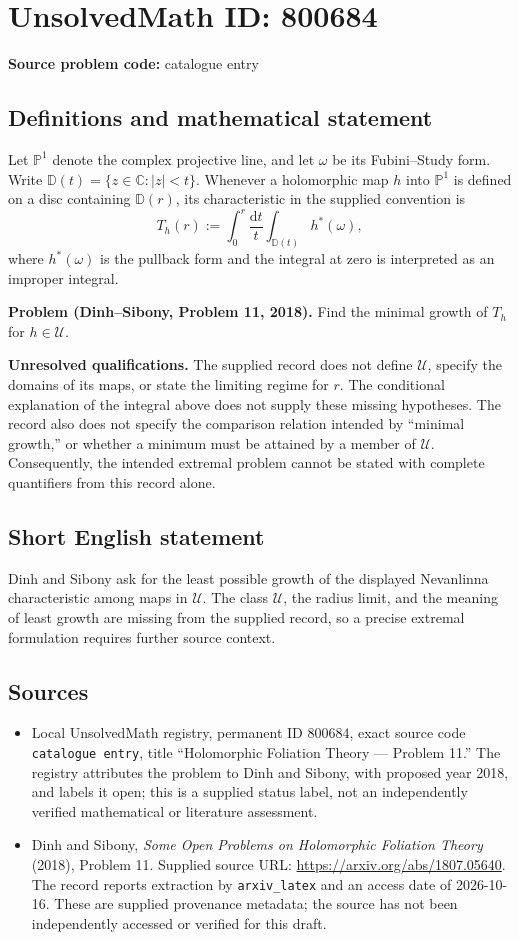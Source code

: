 \documentclass[11pt]{article}
\begin{document}
\section*{UnsolvedMath ID: 800684}
\textbf{Source problem code:} catalogue entry
\subsection{Definitions and mathematical statement}
Let \(\mathbb{P}^{1}\) denote the complex projective line, and let \(\omega\) be its Fubini--Study form. Write \(\mathbb{D}(t)=\{z\in\mathbb{C}:|z|<t\}\). Whenever a holomorphic map \(h\) into \(\mathbb{P}^{1}\) is defined on a disc containing \(\mathbb{D}(r)\), its characteristic in the supplied convention is
\[
T_h(r):=\int_0^r \frac{\mathrm{d}t}{t}\int_{\mathbb{D}(t)}h^*(\omega),
\]
where \(h^*(\omega)\) is the pullback form and the integral at zero is interpreted as an improper integral.

\textbf{Problem (Dinh--Sibony, Problem 11, 2018).} Find the minimal growth of \(T_h\) for \(h\in\mathscr{U}\).

\textbf{Unresolved qualifications.} The supplied record does not define \(\mathscr{U}\), specify the domains of its maps, or state the limiting regime for \(r\). The conditional explanation of the integral above does not supply these missing hypotheses. The record also does not specify the comparison relation intended by ``minimal growth,'' or whether a minimum must be attained by a member of \(\mathscr{U}\). Consequently, the intended extremal problem cannot be stated with complete quantifiers from this record alone.
\subsection{Short English statement}
Dinh and Sibony ask for the least possible growth of the displayed Nevanlinna characteristic among maps in \(\mathscr{U}\). The class \(\mathscr{U}\), the radius limit, and the meaning of least growth are missing from the supplied record, so a precise extremal formulation requires further source context.
\subsection{Sources}
\begin{itemize}
\item Local UnsolvedMath registry, permanent ID \(800684\), exact source code \texttt{catalogue entry}, title ``Holomorphic Foliation Theory --- Problem 11.'' The registry attributes the problem to Dinh and Sibony, with proposed year 2018, and labels it open; this is a supplied status label, not an independently verified mathematical or literature assessment.
\item Dinh and Sibony, \emph{Some Open Problems on Holomorphic Foliation Theory} (2018), Problem 11. Supplied source URL: \url{https://arxiv.org/abs/1807.05640}. The record reports extraction by \texttt{arxiv\_latex} and an access date of 2026-10-16. These are supplied provenance metadata; the source has not been independently accessed or verified for this draft.
\end{itemize}
\end{document}
